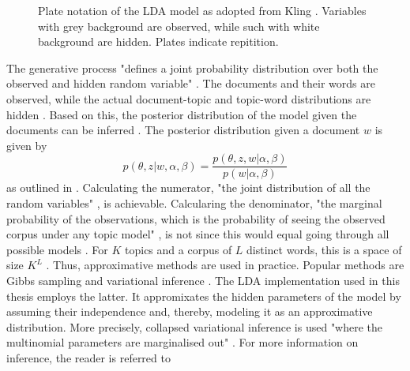 \begin{figure}[t]
\label{fig2}
	\centering
{}

	\caption{Plate notation of the LDA model as adopted from Kling \cite{DBLP:phd/dnb/Kling16}. Variables with grey background are observed, while such with white background are hidden. Plates indicate repitition.}
\end{figure}
\par
The generative process "defines a joint probability distribution over both the observed and hidden random variable" \cite{Blei:2012:PTM:2133806.2133826}. The documents and their words are observed, while the actual document-topic and topic-word distributions are hidden \cite{Blei:2012:PTM:2133806.2133826}.
Based on this, the posterior distribution of the model given the documents can be inferred \cite{Blei:2012:PTM:2133806.2133826}.
The posterior distribution given a document $w$ is given by
\begin{equation}
p(\theta,z|w,\alpha,\beta) = \frac{p(\theta,z,w|\alpha,\beta)}{p(w|\alpha,\beta)}
\end{equation}
as outlined in \cite{DBLP:journals/jmlr/BleiNJ03}. Calculating the numerator, "the joint distribution of all the random variables" \cite{Blei:2012:PTM:2133806.2133826}, is achievable. Calcularing the denominator, "the marginal probability of the observations, which is the probability of seeing the observed corpus under any topic model" \cite{Blei:2012:PTM:2133806.2133826}, is not since this would equal going through all possible models \cite{Blei:2012:PTM:2133806.2133826, DBLP:phd/dnb/Kling16}. For $K$ topics and a corpus of $L$ distinct words, this is a space of size $K^L$ \cite{Blei:2012:PTM:2133806.2133826, DBLP:phd/dnb/Kling16}. Thus, approximative methods are used in practice. Popular methods are Gibbs sampling and variational inference \cite{DBLP:journals/jmlr/BleiNJ03, Blei:2012:PTM:2133806.2133826, DBLP:phd/dnb/Kling16}. The LDA implementation used in this thesis employs the latter. It appromixates the hidden parameters of the model by assuming their independence and, thereby, modeling it as an approximative distribution. More precisely, collapsed variational inference is used "where the multinomial parameters are marginalised out" \cite{DBLP:phd/dnb/Kling16}. For more information on inference, the reader is referred to \cite{DBLP:journals/jmlr/BleiNJ03, Blei:2012:PTM:2133806.2133826, DBLP:phd/dnb/Kling16, Crain2012} \par
